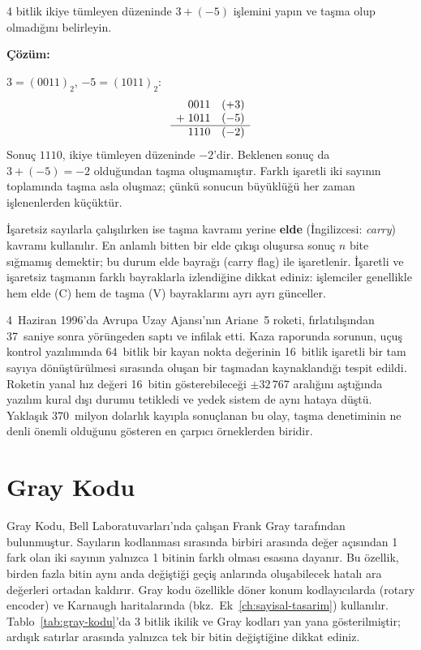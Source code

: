 \begin{ornek}[A.20]
4 bitlik ikiye tümleyen düzeninde $3 + (-5)$ işlemini yapın ve taşma olup olmadığını belirleyin.

\textbf{Çözüm:}

$3 = (0011)_2$, $-5 = (1011)_2$:
\[
\begin{array}{r@{\quad}l}
  0011 & (+3)\\
+\; 1011 & (-5)\\
\hline
  1110 & (-2)
\end{array}
\]
Sonuç $1110$, ikiye tümleyen düzeninde $-2$'dir. Beklenen sonuç da $3 + (-5) = -2$ olduğundan taşma oluşmamıştır. Farklı işaretli iki sayının toplamında taşma asla oluşmaz; çünkü sonucun büyüklüğü her zaman işlenenlerden küçüktür.
\end{ornek}

İşaretsiz sayılarla çalışılırken ise taşma kavramı yerine \textbf{elde} (İngilizcesi: \textit{carry}) kavramı kullanılır. En anlamlı bitten bir elde çıkışı oluşursa sonuç $n$ bite sığmamış demektir; bu durum elde bayrağı (carry flag) ile işaretlenir. İşaretli ve işaretsiz taşmanın farklı bayraklarla izlendiğine dikkat ediniz: işlemciler genellikle hem elde (C) hem de taşma (V) bayraklarını ayrı ayrı günceller.

\begin{bilginot}
4~Haziran 1996'da Avrupa Uzay Ajansı'nın Ariane~5 roketi, fırlatılışından 37~saniye sonra yörüngeden saptı ve infilak etti. Kaza raporunda sorunun, uçuş kontrol yazılımında 64~bitlik bir kayan nokta değerinin 16~bitlik işaretli bir tam sayıya dönüştürülmesi sırasında oluşan bir taşmadan kaynaklandığı tespit edildi. Roketin yanal hız değeri 16~bitin gösterebileceği $\pm 32\,767$ aralığını aştığında yazılım kural dışı durumu tetikledi ve yedek sistem de aynı hataya düştü. Yaklaşık 370~milyon dolarlık kayıpla sonuçlanan bu olay, taşma denetiminin ne denli önemli olduğunu gösteren en çarpıcı örneklerden biridir.
\end{bilginot}

\section{Gray Kodu}
\label{sec:gray-kodu}

Gray Kodu, Bell Laboratuvarları'nda çalışan Frank Gray tarafından bulunmuştur. Sayıların kodlanması sırasında birbiri arasında değer açısından 1 fark olan iki sayının yalnızca 1 bitinin farklı olması esasına dayanır. Bu özellik, birden fazla bitin aynı anda değiştiği geçiş anlarında oluşabilecek hatalı ara değerleri ortadan kaldırır. Gray kodu özellikle döner konum kodlayıcılarda (rotary encoder) ve Karnaugh haritalarında (bkz.\ Ek~\ref{ch:sayisal-tasarim}) kullanılır. Tablo~\ref{tab:gray-kodu}'da 3 bitlik ikilik ve Gray kodları yan yana gösterilmiştir; ardışık satırlar arasında yalnızca tek bir bitin değiştiğine dikkat ediniz.

